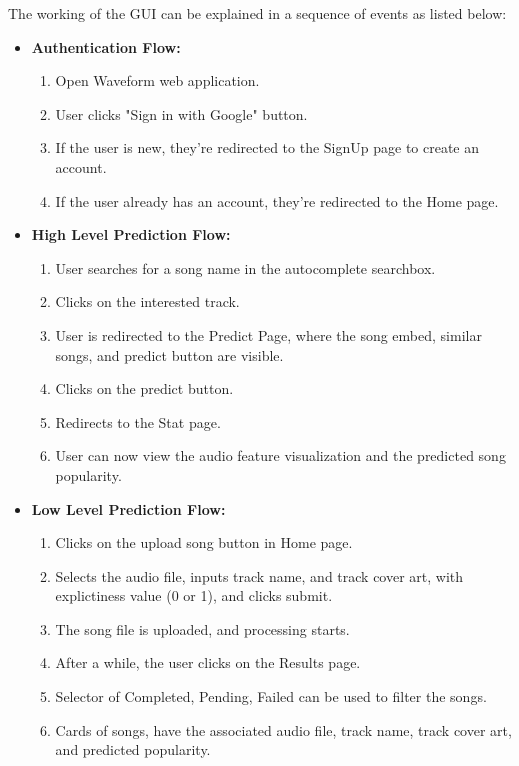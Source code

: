 \documentclass[11pt]{report}
\begin{document}
The working of the GUI can be explained in a sequence of events as listed below:
   \begin{itemize}
    \item \textbf{Authentication Flow:}
    \begin{enumerate}
        \item Open Waveform web application.
        \item User clicks "Sign in with Google" button.
        \item If the user is new, they're redirected to the SignUp page to create an account.
        \item If the user already has an account, they're redirected to the Home page.
    \end{enumerate}
    
    \item \textbf{High Level Prediction Flow:}
    \begin{enumerate}
        \item User searches for a song name in the autocomplete searchbox.
        \item Clicks on the interested track.
        \item User is redirected to the Predict Page, where the song embed, similar songs, and predict button are visible.
        \item Clicks on the predict button.
        \item Redirects to the Stat page.
        \item User can now view the audio feature visualization and the predicted song popularity.
    \end{enumerate}
    
    \item \textbf{Low Level Prediction Flow:}
    \begin{enumerate}
        \item Clicks on the upload song button in Home page.
        \item Selects the audio file, inputs track name, and track cover art, with explictiness value (0 or 1), and clicks submit.
        \item The song file is uploaded, and processing starts.
        \item After a while, the user clicks on the Results page.
        \item Selector of Completed, Pending, Failed can be used to filter the songs.
        \item Cards of songs, have the associated audio file, track name, track cover art, and predicted popularity.
    \end{enumerate}
\end{itemize}
\end{document}
